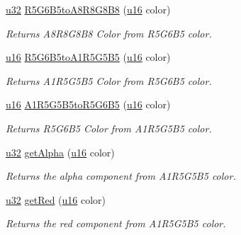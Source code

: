 \begin{DoxyCompactItemize}
\hyperlink{namespaceirr_a0416a53257075833e7002efd0a18e804}{u32} \hyperlink{namespaceirr_1_1video_a421971627afe81533a3c2b51907b72bd}{R5\+G6\+B5to\+A8\+R8\+G8\+B8} (\hyperlink{namespaceirr_ae9f8ec82692ad3b83c21f555bfa70bcc}{u16} color)
\begin{DoxyCompactList}\small\item\em Returns A8\+R8\+G8\+B8 Color from R5\+G6\+B5 color. \end{DoxyCompactList}\item 
\mbox{\label{namespaceirr_1_1video_aaeb39c8fc1b9c4e78b68e2da210f70ff}} 
\hyperlink{namespaceirr_ae9f8ec82692ad3b83c21f555bfa70bcc}{u16} \hyperlink{namespaceirr_1_1video_aaeb39c8fc1b9c4e78b68e2da210f70ff}{R5\+G6\+B5to\+A1\+R5\+G5\+B5} (\hyperlink{namespaceirr_ae9f8ec82692ad3b83c21f555bfa70bcc}{u16} color)
\begin{DoxyCompactList}\small\item\em Returns A1\+R5\+G5\+B5 Color from R5\+G6\+B5 color. \end{DoxyCompactList}\item 
\mbox{\label{namespaceirr_1_1video_a4906b4425165ee533dab17506fe98ce8}} 
\hyperlink{namespaceirr_ae9f8ec82692ad3b83c21f555bfa70bcc}{u16} \hyperlink{namespaceirr_1_1video_a4906b4425165ee533dab17506fe98ce8}{A1\+R5\+G5\+B5to\+R5\+G6\+B5} (\hyperlink{namespaceirr_ae9f8ec82692ad3b83c21f555bfa70bcc}{u16} color)
\begin{DoxyCompactList}\small\item\em Returns R5\+G6\+B5 Color from A1\+R5\+G5\+B5 color. \end{DoxyCompactList}\item 
\hyperlink{namespaceirr_a0416a53257075833e7002efd0a18e804}{u32} \hyperlink{namespaceirr_1_1video_a23358b142a005c4a4c747d227a4d77ab}{get\+Alpha} (\hyperlink{namespaceirr_ae9f8ec82692ad3b83c21f555bfa70bcc}{u16} color)
\begin{DoxyCompactList}\small\item\em Returns the alpha component from A1\+R5\+G5\+B5 color. \end{DoxyCompactList}\item 
\hyperlink{namespaceirr_a0416a53257075833e7002efd0a18e804}{u32} \hyperlink{namespaceirr_1_1video_aa98234702c65c82ce29115b12e89dafe}{get\+Red} (\hyperlink{namespaceirr_ae9f8ec82692ad3b83c21f555bfa70bcc}{u16} color)
\begin{DoxyCompactList}\small\item\em Returns the red component from A1\+R5\+G5\+B5 color. \end{DoxyCompactList}\item 

\end{DoxyCompactItemize}
